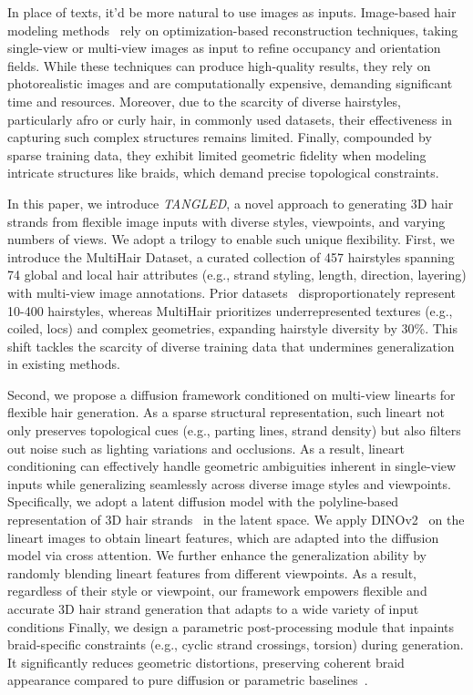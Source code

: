 In place of texts, it’d be more natural to use images as inputs. Image-based hair modeling methods~\cite{kuang2022deepmvshair,wu2024monohair,zhou2018hairnet,wu2022neuralhdhair,zheng2023hairstep,he2024perm} rely on optimization-based reconstruction techniques, taking single-view or multi-view images as input to refine occupancy and orientation fields. While these techniques can produce high-quality results, they rely on photorealistic images and are computationally expensive, demanding significant time and resources. Moreover, due to the scarcity of diverse hairstyles, particularly afro or curly hair, in commonly used datasets, their effectiveness in capturing such complex structures remains limited. Finally, compounded by sparse training data, they exhibit limited geometric fidelity when modeling intricate structures like braids, which demand precise topological constraints.  

In this paper, we introduce \textit{TANGLED}, a novel approach to generating 3D hair strands from flexible image inputs with diverse styles, viewpoints, and varying numbers of views. We adopt a trilogy to enable such unique flexibility.
% 
First, we introduce the MultiHair Dataset, a curated collection of 457 hairstyles spanning 74 global and local hair attributes (e.g., strand styling, length, direction, layering) with multi-view image annotations. Prior datasets~\cite{hu2015uschairsalon, shen2023ct2hair, Hair20k, zhou2018hairnet} disproportionately represent 10-400 hairstyles, whereas MultiHair prioritizes underrepresented textures (e.g., coiled, locs) and complex geometries, expanding hairstyle diversity by 30\%. This shift tackles the scarcity of diverse training data that undermines generalization in existing methods.


Second, we propose a diffusion framework conditioned on multi-view linearts for flexible hair generation. As a sparse structural representation, such lineart not only preserves topological cues (e.g., parting lines, strand density) but also filters out noise such as lighting variations and occlusions. As a result, lineart conditioning can effectively handle geometric ambiguities inherent in single-view inputs while generalizing seamlessly across diverse image styles and viewpoints. 
Specifically, we adopt a latent diffusion model with the polyline-based representation of 3D hair strands~\cite{HAAR:CVPR:2024} in the latent space. We apply DINOv2~\cite{oquab2024dinov2} on the lineart images to obtain lineart features, which are adapted into the diffusion model via cross attention. We further enhance the generalization ability by randomly blending lineart features from different viewpoints. As a result, regardless of their style or viewpoint, our framework empowers flexible and accurate 3D hair strand generation that adapts to a wide variety of input conditions
Finally, we design a parametric post-processing module that inpaints braid-specific constraints (e.g., cyclic strand crossings, torsion) during generation. It significantly reduces geometric distortions, preserving coherent braid appearance compared to pure diffusion or parametric baselines~\cite{zeng2024hairdiffusion}.


